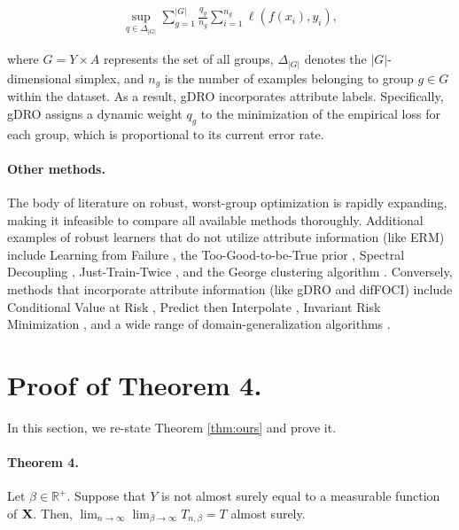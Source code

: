 \begin{align*}
    \sup _{q \in \Delta_{|G|}} \sum_{g=1}^{|G|} \frac{q_g}{n_g} \sum_{i=1}^{n_g} \ell\left(f\left(x_i\right), y_i\right),
\end{align*}

where $G = Y \times A $ represents the set of all groups, $\Delta_{|G|}$ denotes the $|G|$-dimensional simplex, and $n_g$ is the number of examples belonging to group $g \in G$ within the dataset. As a result, gDRO incorporates attribute labels. Specifically, gDRO assigns a dynamic weight $q_g$ to the minimization of the empirical loss for each group, which is proportional to its current error rate.

\paragraph{Other methods.} The body of literature on robust, worst-group optimization is rapidly expanding, making it infeasible to compare all available methods thoroughly. Additional examples of robust learners that do not utilize attribute information (like ERM) include Learning from Failure \citep{nam2020learning}, the Too-Good-to-be-True prior \citep{dagaev2023too}, Spectral Decoupling \citep{pezeshki2021gradient}, Just-Train-Twice \citep{liu2021just}, and the George clustering algorithm \citep{sohoni2020no}. Conversely, methods that incorporate attribute information (like gDRO and difFOCI) include Conditional Value at Risk \citep{duchi2019distributionally}, Predict then Interpolate \citep{bao2021predict}, Invariant Risk Minimization \citep{arjovsky2019invariant}, and a wide range of domain-generalization algorithms \citep{gulrajani2020search}.


\section{Proof of Theorem 4.}
\label{appx:sec_B}

In this section, we re-state Theorem \ref{thm:ours} and prove it.

\paragraph{Theorem 4.}     Let $\beta\in\mathbb{R}^+$. Suppose that $Y$ is not almost surely equal to a measurable function of $\mathbf{X}$. Then, $\lim_{n\rightarrow\infty} \lim_{\beta\rightarrow\infty} T_{n,\beta}= T$ almost surely. 

